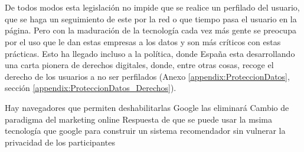 \\ \\
De todos modos esta legislación no impide que se realice un perfilado del usuario, que se haga un seguimiento de este por la red o que tiempo pasa el usuario en la página. Pero con la maduración de la tecnología cada vez más gente se preocupa por el uso que le dan estas empresas a los datos y son más críticos con estas prácticas. Esto ha llegado incluso a la política, donde España esta desarrollando una carta pionera de derechos digitales, donde, entre otras cosas, recoge el derecho de los usuarios a no ser perfilados (Anexo \ref{appendix:ProteccionDatos}, sección \ref{appendix:ProteccionDatos_Derechos}).

Hay navegadores que permiten deshabilitarlas
Google las eliminará
Cambio de paradigma del marketing online
Respuesta de que se puede usar la msima tecnología que google para construir un sistema recomendador sin vulnerar la privacidad de los participantes